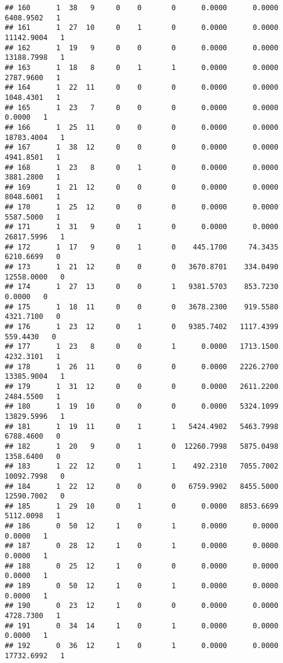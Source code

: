 \documentclass[
]{article}
\begin{document}
\begin{enumerate}
\begin{verbatim}
## 160      1  38   9     0    0       0      0.0000      0.0000   6408.9502   1
## 161      1  27  10     0    1       0      0.0000      0.0000  11142.9004   1
## 162      1  19   9     0    0       0      0.0000      0.0000  13188.7998   1
## 163      1  18   8     0    1       1      0.0000      0.0000   2787.9600   1
## 164      1  22  11     0    0       0      0.0000      0.0000   1048.4301   1
## 165      1  23   7     0    0       0      0.0000      0.0000      0.0000   1
## 166      1  25  11     0    0       0      0.0000      0.0000  18783.4004   1
## 167      1  38  12     0    0       0      0.0000      0.0000   4941.8501   1
## 168      1  23   8     0    1       0      0.0000      0.0000   3881.2800   1
## 169      1  21  12     0    0       0      0.0000      0.0000   8048.6001   1
## 170      1  25  12     0    0       0      0.0000      0.0000   5587.5000   1
## 171      1  31   9     0    1       0      0.0000      0.0000  26817.5996   1
## 172      1  17   9     0    1       0    445.1700     74.3435   6210.6699   0
## 173      1  21  12     0    0       0   3670.8701    334.0490  12558.0000   0
## 174      1  27  13     0    0       1   9381.5703    853.7230      0.0000   0
## 175      1  18  11     0    0       0   3678.2300    919.5580   4321.7100   0
## 176      1  23  12     0    1       0   9385.7402   1117.4399    559.4430   0
## 177      1  23   8     0    0       1      0.0000   1713.1500   4232.3101   1
## 178      1  26  11     0    0       0      0.0000   2226.2700  13385.9004   1
## 179      1  31  12     0    0       0      0.0000   2611.2200   2484.5500   1
## 180      1  19  10     0    0       0      0.0000   5324.1099  13829.5996   1
## 181      1  19  11     0    1       1   5424.4902   5463.7998   6788.4600   0
## 182      1  20   9     0    1       0  12260.7998   5875.0498   1358.6400   0
## 183      1  22  12     0    1       1    492.2310   7055.7002  10092.7998   0
## 184      1  22  12     0    0       0   6759.9902   8455.5000  12590.7002   0
## 185      1  29  10     0    1       0      0.0000   8853.6699   5112.0098   1
## 186      0  50  12     1    0       1      0.0000      0.0000      0.0000   1
## 187      0  28  12     1    0       1      0.0000      0.0000      0.0000   1
## 188      0  25  12     1    0       0      0.0000      0.0000      0.0000   1
## 189      0  50  12     1    0       1      0.0000      0.0000      0.0000   1
## 190      0  23  12     1    0       0      0.0000      0.0000   4728.7300   1
## 191      0  34  14     1    0       1      0.0000      0.0000      0.0000   1
## 192      0  36  12     1    0       1      0.0000      0.0000  17732.6992   1

\end{verbatim}
\end{enumerate}
\end{document}
